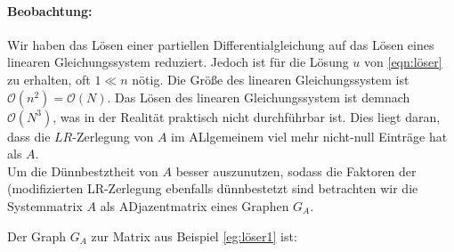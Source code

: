 \paragraph{Beobachtung:} Wir haben das Lösen einer partiellen Differentialgleichung auf das Lösen eines linearen Gleichungssystem reduziert. Jedoch ist für die Lösung $u$ von \eqref{eqn:löser} zu erhalten, oft $1 \ll n$ nötig. Die  Größe des linearen Gleichungssystem ist $\mathcal{O}(n^2) = \mathcal{O}(N)$. Das Lösen des linearen Gleichungssystem ist demnach $\mathcal{O}(N^3)$, was in der Realität praktisch nicht durchführbar ist. Dies liegt daran, dass die $LR$-Zerlegung von $A$ im ALlgemeinem viel mehr nicht-null Einträge hat als $A$.\\
Um die Dünnbestztheit von $A$ besser auszunutzen, sodass die Faktoren der (modifizierten LR-Zerlegung ebenfalls dünnbestetzt sind betrachten wir die Systemmatrix $A$ als ADjazentmatrix eines Graphen $G_A$.
\begin{example}
Der Graph $G_A$ zur Matrix aus Beispiel \ref{eg:löser1} ist:
\begin{center}
\end{center}
\end{example}

